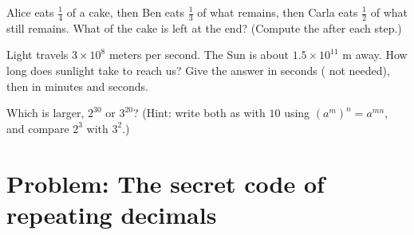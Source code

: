 \begin{exercise}[$\star\star$]\label{exo:g9:fractions:8}
Alice eats $\frac14$ of a cake, then Ben eats $\frac13$ of what remains,
then Carla eats $\frac12$ of what still remains. What  of the
cake is left at the end? (Compute the  after each step.)
\end{exercise}

\begin{exercise}[$\star\star$]\label{exo:g9:fractions:9}
Light travels $3 \times 10^8$ meters per second. The Sun is about
$1.5 \times 10^{11}$ m away. How long does sunlight take to reach us?
Give the answer in seconds ( not needed), then in
minutes and seconds.
\end{exercise}

\begin{exercise}[$\star\star\star$]\label{exo:g9:fractions:10}
Which is larger, $2^{30}$ or $3^{20}$? (Hint: write both as  with
 $10$ using $\left(a^m\right)^n = a^{mn}$, and compare $2^3$ with
$3^2$.)
\end{exercise}

\section{Problem: The secret code of repeating decimals}

